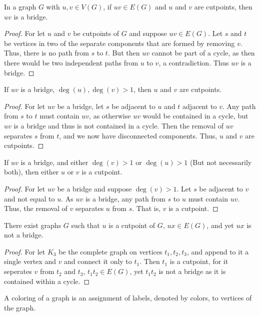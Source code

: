 \documentclass[crop=false,class=book,oneside]{standalone}
\begin{document}
\begin{theorem}
In a graph $G$ with $u,v\in V(G)$, if $uv\in E(G)$ and $u$ and $v$ are cutpoints, then $uv$ is a bridge.
\end{theorem}
\begin{proof}
For let $u$ and $v$ be cutpoints of $G$ and suppose $uv\in E(G)$. Let $s$ and $t$ be vertices in two of the separate components that are formed by removing $v$. Thus, there is no path from $s$ to $t$. But then $uv$ cannot be part of a cycle, as then there would be two independent paths from $u$ to $v$, a contradiction. Thus $uv$ is a bridge.
\end{proof}
\begin{theorem}
If $uv$ is a bridge, $\deg(u),\deg(v)>1$, then $u$ and $v$ are cutpoints.
\end{theorem}
\begin{proof}
For let $uv$ be a bridge, let $s$ be adjacent to $u$ and $t$ adjacent to $v$. Any path from $s$ to $t$ must contain $uv$, as otherwise $uv$ would be contained in a cycle, but $uv$ is a bridge and thus is not contained in a cycle. Then the removal of $uv$ separates $s$ from $t$, and we now have disconnected components. Thus, $u$ and $v$ are cutpoints.
\end{proof}
\begin{corollary}
If $uv$ is a bridge, and either $\deg(v)>1$ or $\deg(u)>1$ (But not necessarily both), then either $u$ or $v$ is a cutpoint.
\end{corollary}
\begin{proof}
For let $uv$ be a bridge and suppose $\deg(v)>1$. Let $s$ be adjacent to $v$ and not equal to $u$. As $uv$ is a bridge, any path from $s$ to $u$ must contain $uv$. Thus, the removal of $v$ separates $u$ from $s$. That is, $v$ is a cutpoint.
\end{proof}
\begin{corollary}
There exist graphs $G$ such that $u$ is a cutpoint of $G$, $ux \in E(G)$, and yet $ux$ is not a bridge.
\end{corollary}
\begin{proof}
For let $K_3$ be the complete graph on vertices $t_1,t_2,t_3$, and append to it a single vertex and $v$ and connect it only to $t_1$. Then $t_1$ is a cutpoint, for it seperates $v$ from $t_2$ and $t_3$, $t_1t_2\in E(G)$, yet $t_1 t_2$ is not a bridge as it is contained within a cycle.
\end{proof}
\begin{definition}
A coloring of a graph is an assignment of labels, denoted by colors, to vertices of the graph.
\end{definition}
\end{document}
